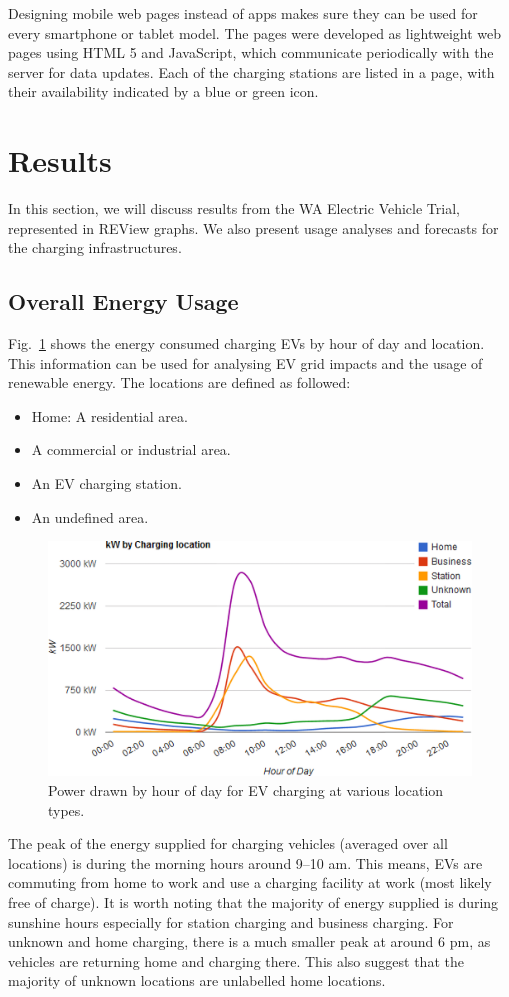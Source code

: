 Designing mobile web pages instead of apps makes sure they can be used for every smartphone or tablet model. The pages were developed as lightweight web pages using HTML 5 and JavaScript, which communicate periodically with the server for data updates. Each of the charging stations are listed in a page, with their availability indicated by a blue or green icon.

\section{Results}
\label{sec:9:results}
In this section, we will discuss results from the WA Electric Vehicle Trial, represented in REView graphs. We also present usage analyses and forecasts for the charging infrastructures.

\subsection{Overall Energy Usage}
Fig.~\ref{fig:9:overalle} shows the energy consumed charging EVs by hour of day and location. This information can be used for analysing EV grid impacts and the usage of renewable energy. The locations are defined as followed:
\begin{itemize}
	\item Home: A residential area.
	\item A commercial or industrial area.
	\item An EV charging station.
	\item An undefined area.
\end{itemize}

\begin{figure}[H]
	\centering
	\includegraphics[width=0.8\linewidth]{overalle}
	\caption{Power drawn by hour of day for EV charging at various location types.}
	\label{fig:9:overalle}
\end{figure}

The peak of the energy supplied for charging vehicles (averaged over all locations) is during the morning hours around 9--10 am. This means, EVs are commuting from home to work and use a charging facility at work (most likely free of charge). It is worth noting that the majority of energy supplied is during sunshine hours especially for station charging and business charging. For unknown and home charging, there is a much smaller peak at around 6 pm, as vehicles are returning home and charging there. This also suggest that the majority of unknown locations are unlabelled home locations.

